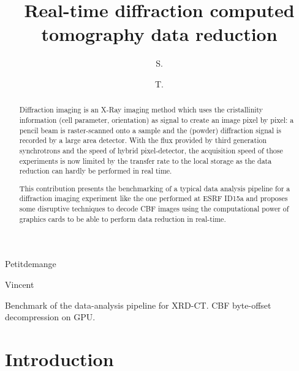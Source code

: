 \documentclass[preprint]{iucr}              %
\begin{document}

 \title{Real-time diffraction computed tomography data reduction}

 \author[a]{S.}{Petitdemange}
 \author[a]{T.}{Vincent}
  





\maketitle                        %

\begin{synopsis}
Benchmark of the data-analysis pipeline for XRD-CT. CBF byte-offset
decompression on GPU.
\end{synopsis}

\begin{abstract}

Diffraction imaging is an X-Ray imaging method which uses the cristallinity
information (cell parameter, orientation) as signal to create an image pixel
by pixel:
a pencil beam is raster-scanned onto a sample and the (powder) diffraction
signal is recorded by a large area detector.
With the flux provided by third generation synchrotrons and the speed of
hybrid pixel-detector, the acquisition speed of those experiments is now 
limited by the transfer rate to the local storage as the data reduction can
hardly be performed in real time.

This contribution presents the benchmarking of a typical data
analysis pipeline for a diffraction imaging experiment like the one performed at
ESRF ID15a and proposes some disruptive techniques to decode CBF images using the
computational power of graphics cards to be able to perform data reduction in
real-time.
\end{abstract}


\section{Introduction}
\end{document}
